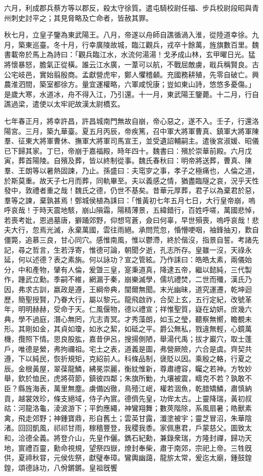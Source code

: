 \begin{pinyinscope}
六月，利成郡兵蔡方等以郡反，殺太守徐質。遣屯騎校尉任福、步兵校尉段昭與青州刺史討平之；其見脅略及亡命者，皆赦其罪。

秋七月，立皇子鑒為東武陽王。八月，帝遂以舟師自譙循渦入淮，從陸道幸徐。九月，築東巡臺。冬十月，行幸廣陵故城，臨江觀兵，戎卒十餘萬，旌旗數百里。魏書載帝於馬上為詩曰：「觀兵臨江水，水流何湯湯！戈矛成山林，玄甲曜日光。猛將懷暴怒，膽氣正從橫。誰云江水廣，一葦可以航，不戰屈敵虜，戢兵稱賢良。古公宅岐邑，實始翦殷商。孟獻營虎牢，鄭人懼稽顙。充國務耕殖，先零自破亡。興農淮泗間，築室都徐方。量宜運權略，六軍咸恱康；豈如東山詩，悠悠多憂傷。」是歲大寒，水道冰，舟不得入江，乃引還。十一月，東武陽王鑒薨。十二月，行自譙過梁，遣使以太牢祀故漢太尉橋玄。

七年春正月，將幸許昌，許昌城南門無故自崩，帝心惡之，遂不入。壬子，行還洛陽宮。三月，築九華臺。夏五月丙辰，帝疾篤，召中軍大將軍曹真、鎮軍大將軍陳羣、征東大將軍曹休、撫軍大將軍司馬宣王，並受遺詔輔嗣主。遣後宮淑媛、昭儀已下歸其家。丁巳，帝崩于嘉福殿，時年四十。魏書曰：殯於崇華前殿。六月戊寅，葬首陽陵。自殯及葬，皆以終制從事。魏氏春秋曰：明帝將送葬，曹真、陳羣、王朗等以暑熱固諫，乃止。孫盛曰：夫窀穸之事，孝子之極痛也，人倫之道，於斯莫重。故天子七月而葬，同軌畢至。夫以義感之情，猶盡臨隧之哀，況乎天性發中，敦禮者重之哉！魏氏之德，仍世不基矣。昔華元厚葬，君子以為棄君於惡，羣等之諫，棄孰甚焉！鄄城侯植為誄曰：「惟黃初七年五月七日，大行皇帝崩，嗚呼哀哉！于時天震地駭，崩山隕霜，陽精薄景，五緯錯行，百姓呼嗟，萬國悲悼，若喪考妣，恩過墓唐，擗踊郊野，仰想穹蒼，僉曰何辜，早世殞喪，嗚呼哀哉！悲夫大行，忽焉光滅，永棄萬國，雲往雨絕。承問荒忽，惛懵哽咽，袖鋒抽刃，歎自僵斃，追慕三良，甘心同穴。感惟南風，惟以鬱滯，終於偕沒，指景自誓。考諸先記，尋之哲言，生若浮寄，惟德可論，朝聞夕逝，孔志所存。皇雖一沒，天祿永延，何以述德？表之素旃。何以詠功？宣之管絃。乃作誄曰：皓皓太素，兩儀始分，中和產物，肈有人倫，爰曁三皇，寔秉道真，降逮五帝，繼以懿純，三代製作，踵武立勳。季嗣不維，網漏于秦，崩樂滅學，儒坑禮焚，二世而殲，漢氏乃因，弗求古訓，嬴政是遵，王綱帝典，闃爾無聞。末光幽昧，道究運遷，乾坤迴歷，簡聖授賢，乃眷大行，屬以黎元。龍飛啟祚，合契上玄，五行定紀，改號革年，明明赫赫，受命于天。仁風偃物，德以禮宣；祥惟聖質，嶷在幼妍。庻幾六典，學不過庭，潛心無罔，亢志青冥。才秀藻朗，如玉之瑩，聽察無嚮，瞻覩未形。其剛如金，其貞如瓊，如氷之絜，如砥之平。爵公無私，戮違無輕，心鏡萬機，攬照下情。思良股肱，嘉昔伊呂，搜揚側陋，舉湯代禹；拔才巖穴，取士蓬戶，唯德是縈，弗拘禰祖。宅土之表，道義是圖，弗營厥險，六合是虞。齊契共遵，下以純民，恢折規矩，克紹前人。科條品制，襃貶以因。乘殷之輅，行夏之辰。金根黃屋，翠葆龍鱗，紼冕崇麗，衡紞惟新，尊肅禮容，矚之若神。方牧妙舉，欽於恤民，虎將荷節，鎮彼四鄰；朱旗所勦，九壤被震，疇克不若？孰敢不臣？縣旌海表，萬里無塵。虜備凶徹，鳥殪江岷，權若涸魚，乾腊矯鱗，肅慎納貢，越裳效珍，條支絕域，侍子內賔。德儕先皇，功侔太古。上靈降瑞，黃初叔祜：河龍洛龜，淩波游下；平鈞應繩，神鸞翔舞；數莢階除，系風扇暑；皓獸素禽，飛走郊野；神鍾寶鼎，形自舊土；雲英甘露，瀸塗被宇；靈芝冒沼，朱華陰渚。回回凱風，祁祁甘雨，稼穡豐登，我稷我黍。家佩惠君，戶蒙慈父。圖致太和，洽德全義。將登介山，先皇作儷。鐫石紀勳，兼錄衆瑞，方隆封禪，歸功天地，賔禮百靈，勳命視規，望祭四嶽，燎封奉柴，肅于南郊，宗祀上帝。三牲旣供，夏禘秋甞，元侯佐祭，獻璧奉璋。鸞輿幽藹，龍旂太常，爰迄太廟，鍾鼓鍠鍠，頌德詠功，八佾鏘鏘。皇祖旣饗
\end{pinyinscope}
